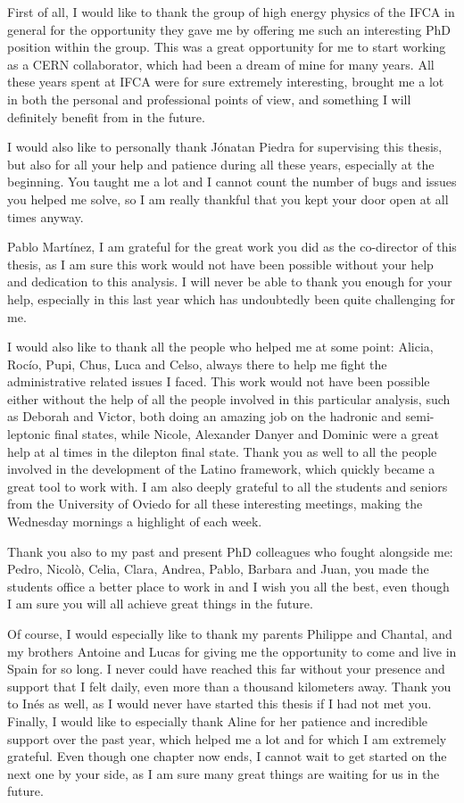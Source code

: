 \documentclass[a4paper, 10pt, openright]{report}
\begin{document}
First of all, I would like to thank the group of high energy physics of the \ac{IFCA} in general for the opportunity they gave me by offering me such an interesting PhD position within the group. This was a great opportunity for me to start working as a CERN collaborator, which had been a dream of mine for many years. All these years spent at \ac{IFCA} were for sure extremely interesting, brought me a lot in both the personal and professional points of view, and something I will definitely benefit from in the future.

I would also like to personally thank J\'{o}natan Piedra for supervising this thesis, but also for all your help and patience during all these years, especially at the beginning. You taught me a lot and I cannot count the number of bugs and issues you helped me solve, so I am really thankful that you kept your door open at all times anyway.

Pablo Mart\'{i}nez, I am grateful for the great work you did as the co-director of this thesis, as I am sure this work would not have been possible without your help and dedication to this analysis. I will never be able to thank you enough for your help, especially in this last year which has undoubtedly been quite challenging for me. 

I would also like to thank all the people who helped me at some point: Alicia, Roc\'{i}o, Pupi, Chus, Luca and Celso, always there to help me fight the administrative related issues I faced. This work would not have been possible either without the help of all the people involved in this particular analysis, such as Deborah and Victor, both doing an amazing job on the hadronic and semi-leptonic final states, while Nicole, Alexander Danyer and Dominic were a great help at al times in the dilepton final state. Thank you as well to all the people involved in the development of the Latino framework, which quickly became a great tool to work with. I am also deeply grateful to all the students and seniors from the University of Oviedo for all these interesting meetings, making the Wednesday mornings a highlight of each week. 

Thank you also to my past and present PhD colleagues who fought alongside me: Pedro, Nicol\`{o}, Celia, Clara, Andrea, Pablo, Barbara and Juan, you made the students office a better place to work in and I wish you all the best, even though I am sure you will all achieve great things in the future.

Of course, I would especially like to thank my parents Philippe and Chantal, and my brothers Antoine and Lucas for giving me the opportunity to come and live in Spain for so long. I never could have reached this far without your presence and support that I felt daily, even more than a thousand kilometers away. Thank you to In\'{e}s as well, as I would never have started this thesis if I had not met you. Finally, I would like to especially thank Aline for her patience and incredible support over the past year, which helped me a lot and for which I am extremely grateful. Even though one chapter now ends, I cannot wait to get started on the next one by your side, as I am sure many great things are waiting for us in the future.
\end{document}
